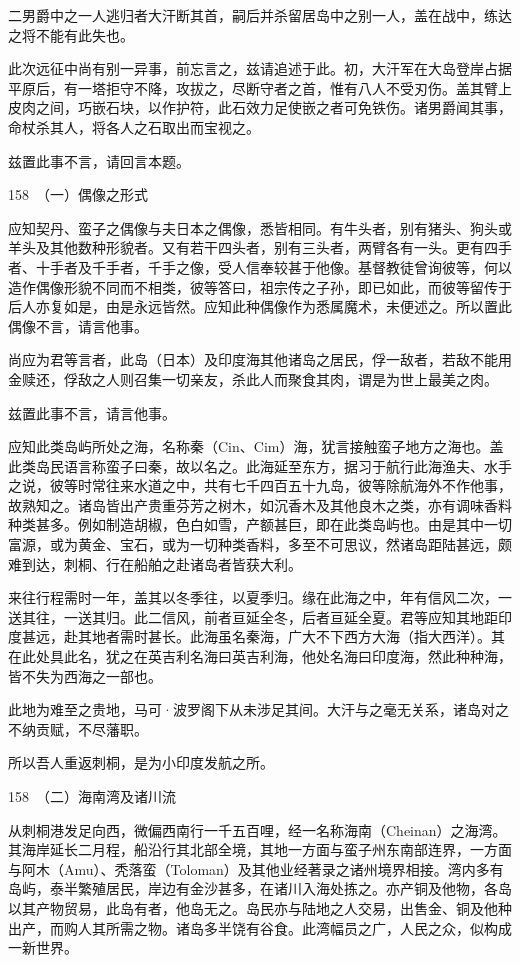 \documentclass[12pt,UTF8]{ctexbook}
\begin{document}
二男爵中之一人逃归者大汗断其首，嗣后并杀留居岛中之别一人，盖在战中，练达之将不能有此失也。

此次远征中尚有别一异事，前忘言之，兹请追述于此。初，大汗军在大岛登岸占据平原后，有一塔拒守不降，攻拔之，尽断守者之首，惟有八人不受刃伤。盖其臂上皮肉之间，巧嵌石块，以作护符，此石效力足使嵌之者可免铁伤。诸男爵闻其事，命杖杀其人，将各人之石取出而宝视之。

兹置此事不言，请回言本题。





158　（一）偶像之形式

应知契丹、蛮子之偶像与夫日本之偶像，悉皆相同。有牛头者，别有猪头、狗头或羊头及其他数种形貌者。又有若干四头者，别有三头者，两臂各有一头。更有四手者、十手者及千手者，千手之像，受人信奉较甚于他像。基督教徒曾询彼等，何以造作偶像形貌不同而不相类，彼等答曰，祖宗传之子孙，即已如此，而彼等留传于后人亦复如是，由是永远皆然。应知此种偶像作为悉属魔术，未便述之。所以置此偶像不言，请言他事。

尚应为君等言者，此岛（日本）及印度海其他诸岛之居民，俘一敌者，若敌不能用金赎还，俘敌之人则召集一切亲友，杀此人而聚食其肉，谓是为世上最美之肉。

兹置此事不言，请言他事。

应知此类岛屿所处之海，名称秦（Cin、Cim）海，犹言接触蛮子地方之海也。盖此类岛民语言称蛮子曰秦，故以名之。此海延至东方，据习于航行此海渔夫、水手之说，彼等时常往来水道之中，共有七千四百五十九岛，彼等除航海外不作他事，故熟知之。诸岛皆出产贵重芬芳之树木，如沉香木及其他良木之类，亦有调味香料种类甚多。例如制造胡椒，色白如雪，产额甚巨，即在此类岛屿也。由是其中一切富源，或为黄金、宝石，或为一切种类香料，多至不可思议，然诸岛距陆甚远，颇难到达，刺桐、行在船舶之赴诸岛者皆获大利。

来往行程需时一年，盖其以冬季往，以夏季归。缘在此海之中，年有信风二次，一送其往，一送其归。此二信风，前者亘延全冬，后者亘延全夏。君等应知其地距印度甚远，赴其地者需时甚长。此海虽名秦海，广大不下西方大海（指大西洋）。其在此处具此名，犹之在英吉利名海曰英吉利海，他处名海曰印度海，然此种种海，皆不失为西海之一部也。

此地为难至之贵地，马可·波罗阁下从未涉足其间。大汗与之毫无关系，诸岛对之不纳贡赋，不尽藩职。

所以吾人重返刺桐，是为小印度发航之所。





158　（二）海南湾及诸川流

从刺桐港发足向西，微偏西南行一千五百哩，经一名称海南（Cheinan）之海湾。其海岸延长二月程，船沿行其北部全境，其地一方面与蛮子州东南部连界，一方面与阿木（Amu）、秃落蛮（Toloman）及其他业经著录之诸州境界相接。湾内多有岛屿，泰半繁殖居民，岸边有金沙甚多，在诸川入海处拣之。亦产铜及他物，各岛以其产物贸易，此岛有者，他岛无之。岛民亦与陆地之人交易，出售金、铜及他种出产，而购人其所需之物。诸岛多半饶有谷食。此湾幅员之广，人民之众，似构成一新世界。
\end{document}
